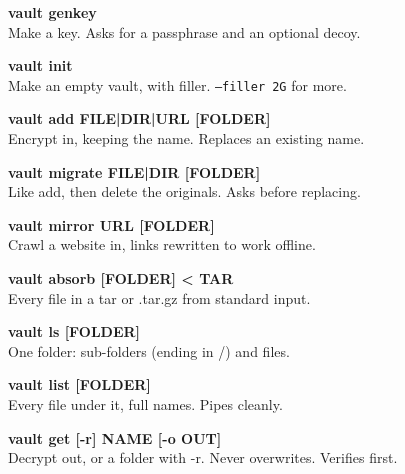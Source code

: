 \documentclass[10pt,oneside,openany]{book}
\begin{document}
\begin{tcbraster}[raster columns=2,raster equal height=rows,raster column skip=8pt,raster row skip=8pt,
  enhanced,colback=vmist,colframe=vline,boxrule=0.4pt,arc=4pt,left=9pt,right=9pt,top=7pt,bottom=7pt]
\begin{tcolorbox}{\ttfamily\color{vtealdeep}\bfseries vault genkey}\\[2pt]\small Make a key. Asks for a passphrase and an optional decoy.\end{tcolorbox}
\begin{tcolorbox}{\ttfamily\color{vtealdeep}\bfseries vault init}\\[2pt]\small Make an empty vault, with filler. \texttt{--filler 2G} for more.\end{tcolorbox}
\begin{tcolorbox}{\ttfamily\color{vtealdeep}\bfseries vault add FILE|DIR|URL [FOLDER]}\\[2pt]\small Encrypt in, keeping the name. Replaces an existing name.\end{tcolorbox}
\begin{tcolorbox}{\ttfamily\color{vtealdeep}\bfseries vault migrate FILE|DIR [FOLDER]}\\[2pt]\small Like add, then delete the originals. Asks before replacing.\end{tcolorbox}
\begin{tcolorbox}{\ttfamily\color{vtealdeep}\bfseries vault mirror URL [FOLDER]}\\[2pt]\small Crawl a website in, links rewritten to work offline.\end{tcolorbox}
\begin{tcolorbox}{\ttfamily\color{vtealdeep}\bfseries vault absorb [FOLDER] < TAR}\\[2pt]\small Every file in a tar or .tar.gz from standard input.\end{tcolorbox}
\begin{tcolorbox}{\ttfamily\color{vtealdeep}\bfseries vault ls [FOLDER]}\\[2pt]\small One folder: sub-folders (ending in /) and files.\end{tcolorbox}
\begin{tcolorbox}{\ttfamily\color{vtealdeep}\bfseries vault list [FOLDER]}\\[2pt]\small Every file under it, full names. Pipes cleanly.\end{tcolorbox}
\begin{tcolorbox}{\ttfamily\color{vtealdeep}\bfseries vault get [-r] NAME [-o OUT]}\\[2pt]\small Decrypt out, or a folder with -r. Never overwrites. Verifies first.\end{tcolorbox}

\end{tcbraster}
\end{document}
